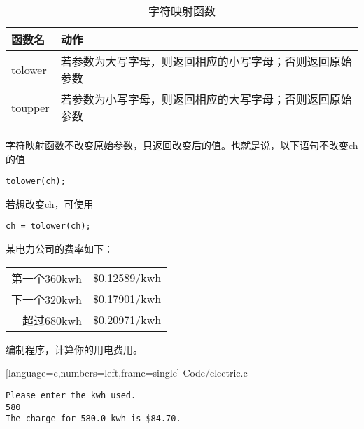 \begin{frame}[fragile]
\begin{table}
\centering
\caption{字符映射函数}
\begin{tabular}{p{2cm}|p{8cm}}\hline
函数名&动作\\\hline\hline 
tolower & 若参数为大写字母，则返回相应的小写字母；否则返回原始参数\\[0.1in]
toupper & 若参数为小写字母，则返回相应的大写字母；否则返回原始参数 \\\hline
\end{tabular}
\end{table}
\end{frame}

\begin{frame}[fragile]
字符映射函数不改变原始参数，只返回改变后的值。也就是说，以下语句不改变ch的值
\begin{lstlisting}
tolower(ch);
\end{lstlisting}
若想改变ch，可使用
\begin{lstlisting}
ch = tolower(ch);
\end{lstlisting}
\end{frame}

\begin{frame}[fragile]
\begin{li}
某电力公司的费率如下：
\begin{table}
\centering
\begin{tabular}{r|l}\hline
第一个360kwh& \$0.12589/kwh\\[0.1in]
下一个320kwh& \$0.17901/kwh\\[0.1in]
超过680kwh & \$0.20971/kwh
\\\hline
\end{tabular}
\end{table}
编制程序，计算你的用电费用。
\end{li}
\end{frame}


\begin{frame}

[language=c,numbers=left,frame=single]
{Code/electric.c}
\end{frame}



\begin{frame}[fragile]
\begin{lstlisting}[backgroundcolor=\color{red!10}]
Please enter the kwh used.
580
The charge for 580.0 kwh is $84.70.
\end{lstlisting}
\end{frame}


